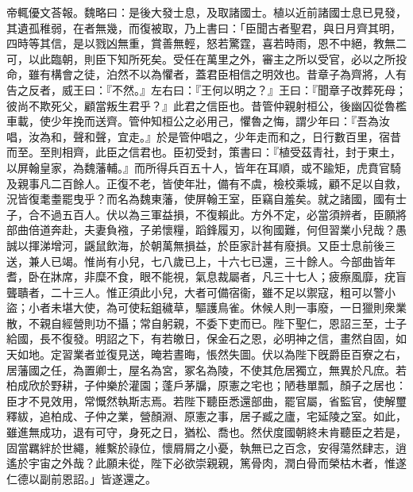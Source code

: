 \begin{pinyinscope}
帝輒優文荅報。魏略曰：是後大發士息，及取諸國士。植以近前諸國士息已見發，其遺孤稚弱，在者無幾，而復被取，乃上書曰：「臣聞古者聖君，與日月齊其明，四時等其信，是以戮凶無重，賞善無輕，怒若驚霆，喜若時雨，恩不中絕，教無二可，以此臨朝，則臣下知所死矣。受任在萬里之外，審主之所以受官，必以之所投命，雖有構會之徒，泊然不以為懼者，蓋君臣相信之明效也。昔章子為齊將，人有告之反者，威王曰：『不然。』左右曰：『王何以明之？』王曰：『聞章子改葬死母；彼尚不欺死父，顧當叛生君乎？』此君之信臣也。昔管仲親射桓公，後幽囚從魯檻車載，使少年挽而送齊。管仲知桓公之必用己，懼魯之悔，謂少年曰：『吾為汝唱，汝為和，聲和聲，宜走。』於是管仲唱之，少年走而和之，日行數百里，宿昔而至。至則相齊，此臣之信君也。臣初受封，策書曰：『植受茲青社，封于東土，以屏翰皇家，為魏藩輔。』而所得兵百五十人，皆年在耳順，或不踰矩，虎賁官騎及親事凡二百餘人。正復不老，皆使年壯，備有不虞，檢校乘城，顧不足以自救，況皆復耄耋罷曳乎？而名為魏東藩，使屏翰王室，臣竊自羞矣。就之諸國，國有士子，合不過五百人。伏以為三軍益損，不復賴此。方外不定，必當須辨者，臣願將部曲倍道奔赴，夫妻負襁，子弟懷糧，蹈鋒履刃，以徇國難，何但習業小兒哉？愚誠以揮涕增河，鼷鼠飲海，於朝萬無損益，於臣家計甚有廢損。又臣士息前後三送，兼人已竭。惟尚有小兒，七八歲已上，十六七已還，三十餘人。今部曲皆年耆，卧在牀席，非糜不食，眼不能視，氣息裁屬者，凡三十七人；疲瘵風靡，疣盲聾聵者，二十三人。惟正須此小兒，大者可備宿衞，雖不足以禦寇，粗可以警小盜；小者未堪大使，為可使耘鉏穢草，驅護鳥雀。休候人則一事廢，一日獵則衆業散，不親自經營則功不攝；常自躬親，不委下吏而已。陛下聖仁，恩詔三至，士子給國，長不復發。明詔之下，有若皦日，保金石之恩，必明神之信，畫然自固，如天如地。定習業者並復見送，晻若晝晦，悵然失圖。伏以為陛下旣爵臣百寮之右，居藩國之任，為置卿士，屋名為宮，冢名為陵，不使其危居獨立，無異於凡庶。若柏成欣於野耕，子仲樂於灌園；蓬戶茅牖，原憲之宅也；陋巷單瓢，顏子之居也：臣才不見效用，常慨然執斯志焉。若陛下聽臣悉還部曲，罷官屬，省監官，使解璽釋紱，追柏成、子仲之業，營顏淵、原憲之事，居子臧之廬，宅延陵之室。如此，雖進無成功，退有可守，身死之日，猶松、喬也。然伏度國朝終未肯聽臣之若是，固當羈絆於世繩，維繫於祿位，懷屑屑之小憂，執無已之百念，安得蕩然肆志，逍遙於宇宙之外哉？此願未從，陛下必欲崇親親，篤骨肉，潤白骨而榮枯木者，惟遂仁德以副前恩詔。」皆遂還之。


\end{pinyinscope}
